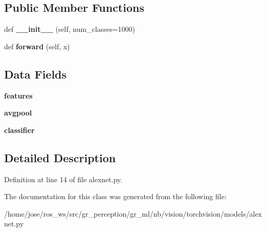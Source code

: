 \subsection*{Public Member Functions}
\begin{DoxyCompactItemize}
\item 
\mbox{\label{classtorchvision_1_1models_1_1alexnet_1_1AlexNet_a586924af0af22619fdaae02fcb3e0d70}} 
def {\bfseries \+\_\+\+\_\+init\+\_\+\+\_\+} (self, num\+\_\+classes=1000)
\item 
\mbox{\label{classtorchvision_1_1models_1_1alexnet_1_1AlexNet_a5355139784eee4ed268517b64c412eba}} 
def {\bfseries forward} (self, x)
\end{DoxyCompactItemize}
\subsection*{Data Fields}
\begin{DoxyCompactItemize}
\item 
\mbox{\label{classtorchvision_1_1models_1_1alexnet_1_1AlexNet_a294f8087de77e22d6c50321fcafb2e0e}} 
{\bfseries features}
\item 
\mbox{\label{classtorchvision_1_1models_1_1alexnet_1_1AlexNet_aa534d5eaae3a277bfb265c4a78cfbc04}} 
{\bfseries avgpool}
\item 
\mbox{\label{classtorchvision_1_1models_1_1alexnet_1_1AlexNet_a852beea893bee8b8ace771e6ede0d5ef}} 
{\bfseries classifier}
\end{DoxyCompactItemize}


\subsection{Detailed Description}


Definition at line 14 of file alexnet.\+py.



The documentation for this class was generated from the following file\+:\begin{DoxyCompactItemize}
\item 
/home/jose/ros\+\_\+ws/src/gr\+\_\+perception/gr\+\_\+ml/nb/vision/torchvision/models/alexnet.\+py\end{DoxyCompactItemize}
